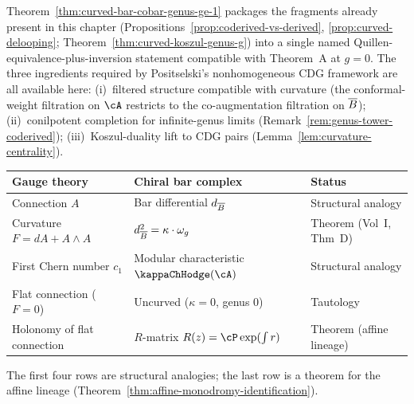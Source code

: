 \begin{remark}
\label{rem:curved-bar-cobar-scope}
Theorem~\ref{thm:curved-bar-cobar-genus-ge-1} packages the
fragments already present in this chapter
(Propositions~\ref{prop:coderived-vs-derived},
\ref{prop:curved-delooping};
Theorem~\ref{thm:curved-koszul-genus-g}) into a single named
Quillen-equivalence-plus-inversion statement compatible with
Theorem~A at $g=0$. The three ingredients required by
Positselski's nonhomogeneous CDG framework are all available here:
(i)~filtered structure compatible with curvature
(the conformal-weight filtration on $\cA$ restricts to the
co-augmentation filtration on $\overline{B}$); (ii)~conilpotent
completion for infinite-genus limits
(Remark~\ref{rem:genus-tower-coderived}); (iii)~Koszul-duality
lift to CDG pairs (Lemma~\ref{lem:curvature-centrality}).
\end{remark}

\begin{remark}
\label{rem:chern-weil-dictionary}
\renewcommand{\arraystretch}{1.15}
\begin{center}
\begin{tabular}{@{}lll@{}}
\toprule
\textbf{Gauge theory} & \textbf{Chiral bar complex} & \textbf{Status} \\
\midrule
Connection $A$ & Bar differential $d_{\overline{B}}$ & Structural analogy \\
Curvature $F = dA + A \wedge A$ & $d_{\overline{B}}^2 = \kappa \cdot \omega_g$ & Theorem (Vol~I, Thm~D) \\
First Chern number $c_1$ & Modular characteristic $\kappaChHodge(\cA)$ & Structural analogy \\
Flat connection ($F = 0$) & Uncurved ($\kappa = 0$, genus $0$) & Tautology \\
Holonomy of flat connection & $R$-matrix $R(z) = \cP\exp(\int r)$ & Theorem (affine lineage) \\
\bottomrule
\end{tabular}
\end{center}
The first four rows are structural analogies; the last row is a theorem for the affine lineage (Theorem~\ref{thm:affine-monodromy-identification}).
\end{remark}

